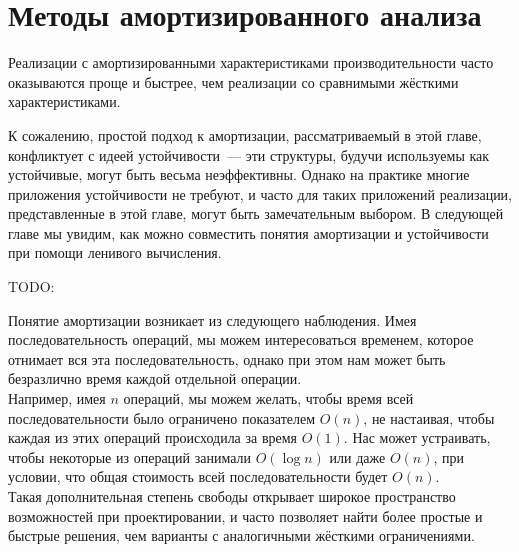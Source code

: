 




\section{Методы амортизированного анализа}
\label{sc:5.1}


\begin{frame}[fragile]{}
Реализации с амортизированными
характеристиками производительности часто оказываются проще и быстрее,
чем реализации со сравнимыми жёсткими характеристиками.

К сожалению, простой подход к амортизации, рассматриваемый в этой
главе, конфликтует с идеей устойчивости~--- эти структуры, будучи
используемы как устойчивые, могут быть весьма неэффективны. Однако на
практике многие приложения устойчивости не требуют, и часто для таких
приложений реализации, представленные в этой главе, могут быть
замечательным выбором. В следующей главе мы увидим, как можно
совместить понятия амортизации и устойчивости при помощи ленивого
вычисления.

TODO:
\end{frame}


\begin{frame}[fragile]{}
Понятие амортизации возникает из следующего наблюдения.  Имея
последовательность операций, мы можем интересоваться временем, которое
отнимает вся эта последовательность, однако при этом нам может быть
безразлично время каждой отдельной операции.\\

 Например, имея $n$
операций, мы можем желать, чтобы время всей последовательности было
ограничено показателем $O(n)$, не настаивая, чтобы каждая из этих
операций происходила за время $O(1)$. Нас может устраивать, чтобы
некоторые из операций занимали $O(\log n)$ или даже $O(n)$, при
условии, что общая стоимость всей последовательности будет
$O(n)$. \\

Такая дополнительная степень свободы открывает широкое
пространство возможностей при проектировании, и часто позволяет найти
более простые и быстрые решения, чем варианты с аналогичными жёсткими
ограничениями.

\end{frame}


